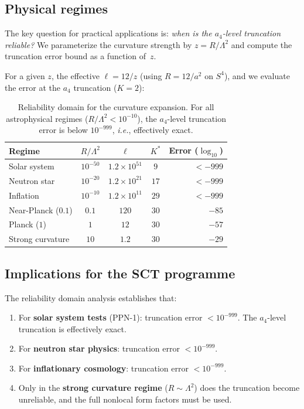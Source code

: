\documentclass[11pt,a4paper]{article}
\newcommand{\ie}{\textit{i.e.}}
\newcommand{\Lam}{\Lambda}
\theoremstyle{plain}
\theoremstyle{definition}
\begin{document}
\subsection{Physical regimes}

The key question for practical applications is: \emph{when is the
$a_4$-level truncation reliable?}  We parameterize the curvature strength
by $z = R/\Lam^2$ and compute the truncation error bound as a function of~$z$.

For a given $z$, the effective $\ell = 12/z$ (using $R = 12/a^2$ on $S^4$),
and we evaluate the error at the $a_4$ truncation ($K = 2$):

\begin{table}[h]
\centering
\begin{tabular}{lcccr}
\toprule
Regime & $R/\Lam^2$ & $\ell$ & $K^*$ & Error ($\log_{10}$) \\
\midrule
Solar system & $10^{-50}$ & $1.2\times 10^{51}$ & $9$ & $< -999$ \\
Neutron star & $10^{-20}$ & $1.2\times 10^{21}$ & $17$ & $< -999$ \\
Inflation & $10^{-10}$ & $1.2\times 10^{11}$ & $29$ & $< -999$ \\
Near-Planck ($0.1$) & $0.1$ & $120$ & $30$ & $-85$ \\
Planck ($1$) & $1$ & $12$ & $30$ & $-57$ \\
Strong curvature & $10$ & $1.2$ & $30$ & $-29$ \\
\bottomrule
\end{tabular}
\caption{Reliability domain for the curvature expansion.
For all astrophysical regimes ($R/\Lam^2 < 10^{-10}$),
the $a_4$-level truncation error is below $10^{-999}$,
\ie, effectively exact.}
\label{tab:reliability}
\end{table}

\subsection{Implications for the SCT programme}

The reliability domain analysis establishes that:

\begin{enumerate}
  \item For \textbf{solar system tests} (PPN-1): truncation error
    $< 10^{-999}$.  The $a_4$-level truncation is effectively exact.
  \item For \textbf{neutron star physics}: truncation error $< 10^{-999}$.
  \item For \textbf{inflationary cosmology}: truncation error $< 10^{-999}$.
  \item Only in the \textbf{strong curvature regime} ($R \sim \Lam^2$)
    does the truncation become unreliable, and the full nonlocal form factors
    must be used.
\end{enumerate}
\end{document}
